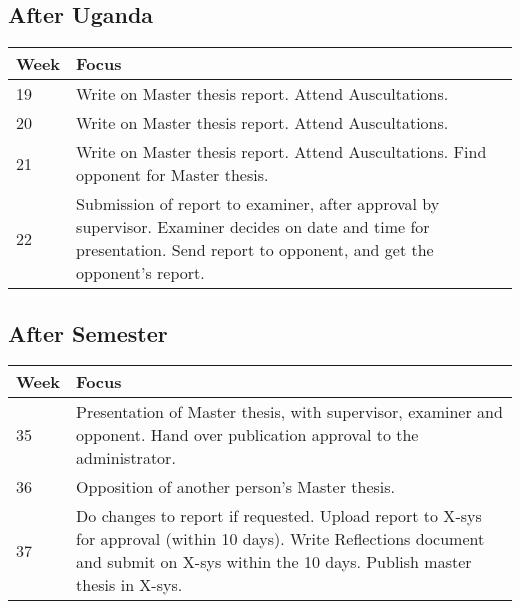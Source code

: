 \subsection{After Uganda}
\begin{center}
    \begin{tabular}{ | l | p{10cm} |}
    \hline
    Week & Focus \\ \hline
    19 & Write on Master thesis report. Attend Auscultations. \\ \hline
    20 & Write on Master thesis report. Attend Auscultations. \\ \hline
    21 & Write on Master thesis report. Attend Auscultations. Find opponent for Master thesis. \\ \hline
    22 & Submission of report to examiner, after approval by supervisor. Examiner decides on date and time for presentation. Send report to opponent, and get the opponent's report. \\ \hline
    \end{tabular}
\end{center}

\subsection{After Semester}

\begin{center}
    \begin{tabular}{ | l | p{10cm} |}
    \hline
    Week & Focus \\ \hline
    35 & Presentation of Master thesis, with supervisor, examiner and opponent. Hand over publication approval to the administrator. \\ \hline
    36 & Opposition of another person's Master thesis. \\ \hline
    37 & Do changes to report if requested. Upload report to X-sys for approval (within 10 days). Write Reflections document and submit on X-sys within the 10 days. Publish master thesis in X-sys. \\ \hline
    \end{tabular}
\end{center}
